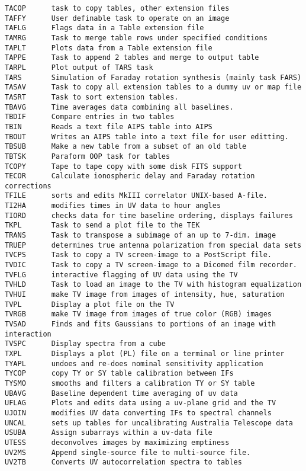\begin{verbatim}
TACOP      task to copy tables, other extension files
TAFFY      User definable task to operate on an image
TAFLG      Flags data in a Table extension file
TAMRG      Task to merge table rows under specified conditions
TAPLT      Plots data from a Table extension file
TAPPE      Task to append 2 tables and merge to output table
TARPL      Plot output of TARS task
TARS       Simulation of Faraday rotation synthesis (mainly task FARS)
TASAV      Task to copy all extension tables to a dummy uv or map file
TASRT      Task to sort extension tables.
TBAVG      Time averages data combining all baselines.
TBDIF      Compare entries in two tables
TBIN       Reads a text file AIPS table into AIPS
TBOUT      Writes an AIPS table into a text file for user editting.
TBSUB      Make a new table from a subset of an old table
TBTSK      Paraform OOP task for tables
TCOPY      Tape to tape copy with some disk FITS support
TECOR      Calculate ionospheric delay and Faraday rotation corrections
TFILE      sorts and edits MkIII correlator UNIX-based A-file.
TI2HA      modifies times in UV data to hour angles
TIORD      checks data for time baseline ordering, displays failures
TKPL       Task to send a plot file to the TEK
TRANS      Task to transpose a subimage of an up to 7-dim. image
TRUEP      determines true antenna polarization from special data sets
TVCPS      Task to copy a TV screen-image to a PostScript file.
TVDIC      Task to copy a TV screen-image to a Dicomed film recorder.
TVFLG      interactive flagging of UV data using the TV
TVHLD      Task to load an image to the TV with histogram equalization
TVHUI      make TV image from images of intensity, hue, saturation
TVPL       Display a plot file on the TV
TVRGB      make TV image from images of true color (RGB) images
TVSAD      Finds and fits Gaussians to portions of an image with interaction
TVSPC      Display spectra from a cube
TXPL       Displays a plot (PL) file on a terminal or line printer
TYAPL      undoes and re-does nominal sensitivity application
TYCOP      copy TY or SY table calibration between IFs
TYSMO      smooths and filters a calibration TY or SY table
UBAVG      Baseline dependent time averaging of uv data
UFLAG      Plots and edits data using a uv-plane grid and the TV
UJOIN      modifies UV data converting IFs to spectral channels
UNCAL      sets up tables for uncalibrating Australia Telescope data
USUBA      Assign subarrays within a uv-data file
UTESS      deconvolves images by maximizing emptiness
UV2MS      Append single-source file to multi-source file.
UV2TB      Converts UV autocorrelation spectra to tables

\end{verbatim}
